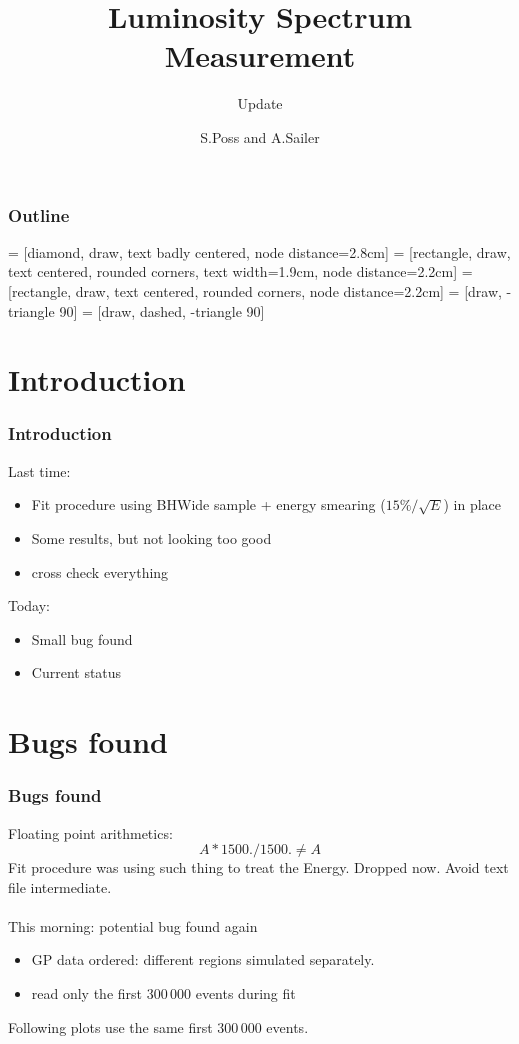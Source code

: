 \documentclass{beamer}
\author{S.Poss and A.Sailer}
\title{Luminosity Spectrum Measurement}
\subtitle{Update}
\begin{document}
\begin{frame}
\titlepage
\end{frame}
\begin{frame}
\frametitle{Outline}
\tableofcontents
\end{frame}
 = [diamond, draw, text badly centered, node distance=2.8cm]
 = [rectangle, draw, text centered, rounded corners, text width=1.9cm, node distance=2.2cm]
 = [rectangle, draw, text centered, rounded corners, node distance=2.2cm]
 = [draw, -triangle 90]
 = [draw, dashed, -triangle 90]
\section{Introduction}

\begin{frame}
\frametitle{Introduction}
Last time:
\begin{itemize}
  \item Fit procedure using BHWide sample + energy smearing ($15\%/\sqrt{E}$) in
  place
  \item Some results, but not looking too good
  \item cross check everything
\end{itemize}
Today:
\begin{itemize}
  \item Small bug found
  \item Current status
\end{itemize}
\end{frame}
\section{Bugs found}
\begin{frame}
\frametitle{Bugs found}
Floating point arithmetics:\\
\begin{displaymath}
A*1500./1500. \neq A
\end{displaymath}
Fit procedure was using such thing to treat the Energy. Dropped now. Avoid text
file intermediate.\\
~\\
This morning: potential bug found again
\begin{itemize}
  \item GP data ordered: different regions simulated separately.
  \item read only the first 300\,000 events during fit
\end{itemize}
Following plots use the same first 300\,000 events.
\end{frame}
\end{document}
